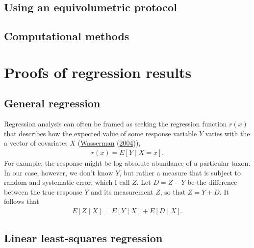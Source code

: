 \documentclass[
]{article}
\theoremstyle{definition}
\theoremstyle{definition}
\theoremstyle{definition}
\theoremstyle{definition}
\theoremstyle{remark}
\begin{document}
\hypertarget{using-an-equivolumetric-protocol}{%
\subsection{Using an equivolumetric protocol}\label{using-an-equivolumetric-protocol}}

\hypertarget{computational-methods}{%
\subsection{Computational methods}\label{computational-methods}}

\hypertarget{proofs-of-regression-results}{%
\section{Proofs of regression results}\label{proofs-of-regression-results}}

\hypertarget{general-regression}{%
\subsection{General regression}\label{general-regression}}

Regression analysis can often be framed as seeking the regression function \(r(x)\) that describes how the expected value of some response variable \(Y\) varies with the a vector of covariates \(X\) (\protect\hyperlink{ref-wasserman2004allo}{Wasserman} (\protect\hyperlink{ref-wasserman2004allo}{2004})),
\begin{align}
  r(x) = E [Y \mid X = x].
\end{align}
For example, the response might be log absolute abundance of a particular taxon.
In our case, however, we don't know \(Y\), but rather a measure that is subject to random and systematic error, which I call \(Z\).
Let \(D = Z - Y\) be the difference between the true response \(Y\) and its measurement \(Z\), so that \(Z = Y + D\).
It follows that
\begin{align}
  \label{eq:regression-error}
  E [Z \mid X] = E [Y \mid X] + E [D \mid X].
\end{align}

\hypertarget{linear-least-squares-regression}{%
\subsection{Linear least-squares regression}\label{linear-least-squares-regression}}
\end{document}
